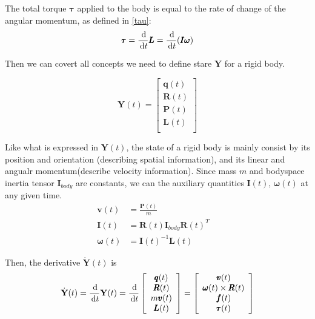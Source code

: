 The total torque $\pmb{\tau}$ applied to the body is equal to the rate of change of the angular momentum, as defined in \ref{tau}:
\begin{equation}
    \pmb{\tau} = \frac{\,\mathrm{d}}{\,\mathrm{d} t }\pmb{L} = \frac{\,\mathrm{d}}{\,\mathrm{d} t }(\pmb{I}\pmb{\omega})
    \label{tau}
\end{equation}

 Then we can covert all concepts we need to define stare $\textbf{Y}$ for a rigid body.

\begin{equation}
    \textbf{Y}(t) = \left[
        \begin{array}{c}
            \pmb{q}(t) \\
            \pmb{R}(t) \\
            \pmb{P}(t) \\
            \pmb{L}(t) \\
        \end{array}
    \right]
\end{equation}

Like what is expressed in $\textbf{Y}(t)$, the state of a rigid body is mainly consist by its position and orientation (describing spatial information), and its linear and angualr momentum(describe velocity information). Since mass $m$ and bodyspace inertia tensor $\pmb{I}_{body}$ are constants, we can the auxiliary quantities $\pmb{I}(t)$, $\pmb{\omega}(t)$ at any given time.
\begin{subequations}
\begin{align}
    \pmb{v}(t) & = \frac{\pmb{P}(t)}{m} \quad \\
    \pmb{I}(t) & = \pmb{R}(t)\pmb{I}_{body}\pmb{R}(t)^{T} \quad \\
    \pmb{\omega}(t) & = \pmb{I}(t)^{-1}\pmb{L}(t) 
\end{align}
\end{subequations}

Then, the derivative $\dot{\textbf{Y}}(t)$ is
\begin{equation}
    \dot{\textbf{Y}}(t) = \frac{\,\mathrm{d}}{\,\mathrm{d}{t}}\textbf{Y}(t) = \frac{\,\mathrm{d}}{\,\mathrm{d} t}\left[
        \begin{array}{c}
            \pmb{q}(t) \\
            \pmb{R}(t) \\
            m \pmb{v}(t) \\
            \pmb{L}(t) \\
        \end{array}
    \right] = \left[
        \begin{array}{c}
            \pmb{v}(t) \\
            \pmb{\omega}(t)\times\pmb{R}(t) \\
            \pmb{f}(t) \\
            \pmb{\tau}(t) \\
        \end{array}
    \right]
\end{equation}

